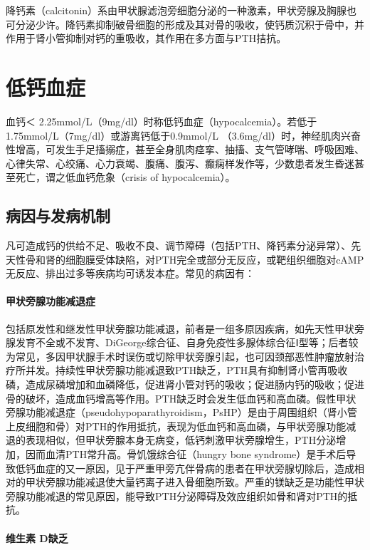 降钙素（calcitonin）系由甲状腺滤泡旁细胞分泌的一种激素，甲状旁腺及胸腺也可分泌少许。降钙素抑制破骨细胞的形成及其对骨的吸收，使钙质沉积于骨中，并作用于肾小管抑制对钙的重吸收，其作用在多方面与PTH拮抗。

\section{低钙血症}

血钙＜
2.25mmol/L（9mg/dl）时称低钙血症（hypocalcemia）。若低于1.75mmol/L（7mg/dl）或游离钙低于0.9mmol/L
（3.6mg/dl）时，神经肌肉兴奋性增高，可发生手足搐搦症，甚至全身肌肉痉挛、抽搐、支气管哮喘、呼吸困难、心律失常、心绞痛、心力衰竭、腹痛、腹泻、癫痫样发作等，少数患者发生昏迷甚至死亡，谓之低血钙危象（crisis
of hypocalcemia）。

\subsection{病因与发病机制}

凡可造成钙的供给不足、吸收不良、调节障碍（包括PTH、降钙素分泌异常）、先天性骨和肾的细胞膜受体缺陷，对PTH完全或部分无反应，或靶组织细胞对cAMP无反应、排出过多等疾病均可诱发本症。常见的病因有：

\paragraph{甲状旁腺功能减退症}

包括原发性和继发性甲状旁腺功能减退，前者是一组多原因疾病，如先天性甲状旁腺发育不全或不发育、DiGeorge综合征、自身免疫性多腺体综合征Ⅰ型等；后者较为常见，多因甲状腺手术时误伤或切除甲状旁腺引起，也可因颈部恶性肿瘤放射治疗所并发。持续性甲状旁腺功能减退致PTH缺乏，PTH具有抑制肾小管再吸收磷，造成尿磷增加和血磷降低，促进肾小管对钙的吸收；促进肠内钙的吸收；促进骨的破坏，造成血钙增高等作用。PTH缺乏时会发生低血钙和高血磷。假性甲状旁腺功能减退症（pseudohypoparathyroidism，PsHP）是由于周围组织（肾小管上皮细胞和骨）对PTH的作用抵抗，表现为低血钙和高血磷，与甲状旁腺功能减退的表现相似，但甲状旁腺本身无病变，低钙刺激甲状旁腺增生，PTH分泌增加，因而血清PTH常升高。骨饥饿综合征（hungry
bone
syndrome）是手术后导致低钙血症的又一原因，见于严重甲旁亢伴骨病的患者在甲状旁腺切除后，造成相对的甲状旁腺功能减退使大量钙离子进入骨细胞所致。严重的镁缺乏是功能性甲状旁腺功能减退的常见原因，能导致PTH分泌障碍及效应组织如骨和肾对PTH的抵抗。

\paragraph{维生素 D缺乏}

